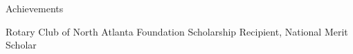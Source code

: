 \documentclass{resume}
\begin{document}
\begin{rSection}{Achievements}

    Rotary Club of North Atlanta Foundation Scholarship Recipient, National Merit Scholar

\end{rSection}
\end{document}
